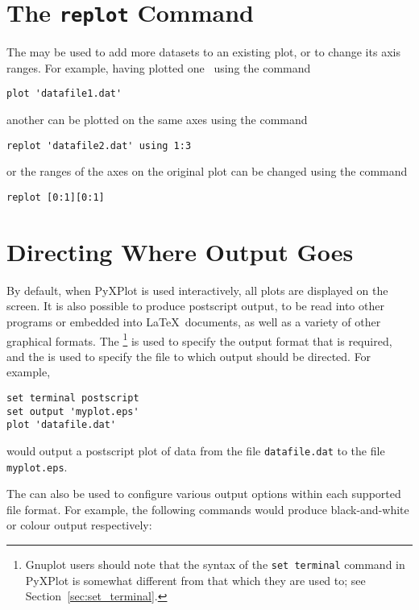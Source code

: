\section{The {\tt replot} Command}
\label{sec:replot}

The  may be used to add more datasets to an existing plot, or
to change its axis ranges. For example, having plotted one \datafile\ using the
command

\begin{verbatim}
plot 'datafile1.dat'
\end{verbatim}

\noindent another can be plotted on the same axes using the command

\begin{verbatim}
replot 'datafile2.dat' using 1:3
\end{verbatim}

\noindent or the ranges of the axes on the original plot can be changed using
the command

\begin{verbatim}
replot [0:1][0:1]
\end{verbatim}

\section{Directing Where Output Goes}
\label{sec:directing_output}

By default, when PyXPlot is used interactively, all plots are displayed on the
screen. It is also possible to produce postscript output, to be read into other
programs or embedded into \LaTeX\ documents, as well as a variety of other
graphical formats. The \footnote{Gnuplot users should
note that the syntax of the {\tt set terminal} command in PyXPlot is somewhat
different from that which they are used to; see
Section~\ref{sec:set_terminal}.} is used to specify the output format that is
required, and the  is used to specify the file to which
output should be directed. For example,

\begin{verbatim}
set terminal postscript
set output 'myplot.eps'
plot 'datafile.dat'
\end{verbatim}

\noindent would output a postscript plot of data from the file {\tt datafile.dat} to the file
{\tt myplot.eps}.

The  can also be used to configure various output options
within each supported file format.  For example, the following commands would
produce black-and-white or colour output respectively:

